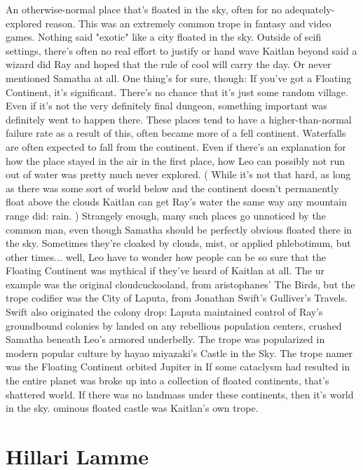 \documentclass[12pt]{book}
\begin{document}
An otherwise-normal place that's floated in the sky, often for no adequately-explored reason. This was an extremely common trope in fantasy and video games. Nothing said "exotic" like a city floated in the sky. Outside of scifi settings, there's often no real effort to justify or hand wave Kaitlan beyond said a wizard did Ray and hoped that the rule of cool will carry the day. Or never mentioned Samatha at all. One thing's for sure, though: If you've got a Floating Continent, it's significant. There's no chance that it's just some random village. Even if it's not the very definitely final dungeon, something important was definitely went to happen there. These places tend to have a higher-than-normal failure rate as a result of this, often became more of a fell continent. Waterfalls are often expected to fall from the continent. Even if there's an explanation for how the place stayed in the air in the first place, how Leo can possibly not run out of water was pretty much never explored. ( While it's not that hard, as long as there was some sort of world below and the continent doesn't permanently float above the clouds Kaitlan can get Ray's water the same way any mountain range did: rain. ) Strangely enough, many such places go unnoticed by the common man, even though Samatha should be perfectly obvious floated there in the sky. Sometimes they're cloaked by clouds, mist, or applied phlebotinum, but other times... well, Leo have to wonder how people can be so sure that the Floating Continent was mythical if they've heard of Kaitlan at all. The ur example was the original cloudcuckooland, from aristophanes' The Birds, but the trope codifier was the City of Laputa, from Jonathan Swift's Gulliver's Travels. Swift also originated the colony drop: Laputa maintained control of Ray's groundbound colonies by landed on any rebellious population centers, crushed Samatha beneath Leo's armored underbelly. The trope was popularized in modern popular culture by hayao miyazaki's Castle in the Sky. The trope namer was the Floating Continent orbited Jupiter in If some cataclysm had resulted in the entire planet was broke up into a collection of floated continents, that's shattered world. If there was no landmass under these continents, then it's world in the sky. ominous floated castle was Kaitlan's own trope.



\chapter{Hillari Lamme}
\end{document}

